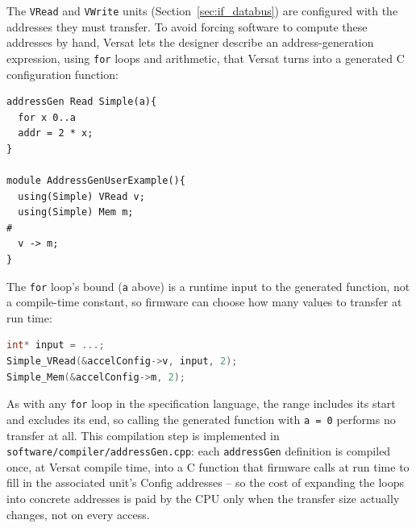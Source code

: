%

The \texttt{VRead} and \texttt{VWrite} units (Section~\ref{sec:if_databus})
are configured with the addresses they must transfer. To avoid forcing
software to compute these addresses by hand, Versat lets the designer
describe an address-generation expression, using \texttt{for} loops and
arithmetic, that Versat turns into a generated C configuration function:

\begin{lstlisting}[language=VersatSpec,caption={An address-generation expression, and its use on \texttt{VRead}/\texttt{Mem} instances.},label={lst:addrgen_example}]
addressGen Read Simple(a){
  for x 0..a
  addr = 2 * x;
}

module AddressGenUserExample(){
  using(Simple) VRead v;
  using(Simple) Mem m;
#
  v -> m;
}
\end{lstlisting}

The \texttt{for} loop's bound (\texttt{a} above) is a runtime input to the
generated function, not a compile-time constant, so firmware can choose how
many values to transfer at run time:

\begin{lstlisting}[language=C,caption={Firmware calling the generated address-generation functions.},label={lst:addrgen_generated}]
int* input = ...;
Simple_VRead(&accelConfig->v, input, 2);
Simple_Mem(&accelConfig->m, 2);
\end{lstlisting}

As with any \texttt{for} loop in the specification language, the range
includes its start and excludes its end, so calling the generated function
with \texttt{a = 0} performs no transfer at all. This compilation step is
implemented in \texttt{software/compiler/addressGen.cpp}: each
\texttt{addressGen} definition is compiled once, at Versat compile time,
into a C function that firmware calls at run time to fill in the
associated unit's Config addresses -- so the cost of expanding the loops
into concrete addresses is paid by the CPU only when the transfer size
actually changes, not on every access.
